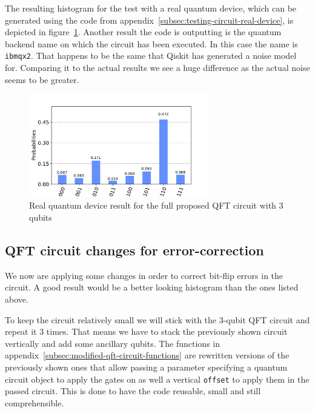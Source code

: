 The resulting histogram for the test with a real quantum device, which can be generated using the code from appendix~\ref{subsec:testing-circuit-real-device}, is depicted in figure~\ref{fig:test-histogram-real-device}.
Another result the code is outputting is the quantum backend name on which the circuit has been executed.
In this case the name is \texttt{ibmqx2}.
That happens to be the same that Qiskit has generated a noise model for.
Comparing it to the actual results we see a huge difference as the actual noise seems to be greater.

\begin{figure}[H]
    \centering
    \includegraphics[width=0.7\textwidth]{res/test-histogram-real-quantum-device.pdf}
    \caption{Real quantum device result for the full proposed QFT circuit with 3 qubits}
    \label{fig:test-histogram-real-device}
\end{figure}

\subsection{QFT circuit changes for error-correction}
\label{subsec:qft-circuit-error-correction}

We now are applying some changes in order to correct bit-flip errors in the circuit.
A good result would be a better looking histogram than the ones listed above.

To keep the circuit relatively small we will stick with the 3-qubit QFT circuit and repeat it 3 times.
That means we have to stack the previously shown circuit vertically and add some ancillary qubits.
The functions in appendix~\ref{subsec:modified-qft-circuit-functions} are rewritten versions of the previously shown ones that allow passing a parameter specifying a quantum circuit object to apply the gates on as well a vertical \texttt{offset} to apply them in the passed circuit.
This is done to have the code reusable, small and still comprehensible.

